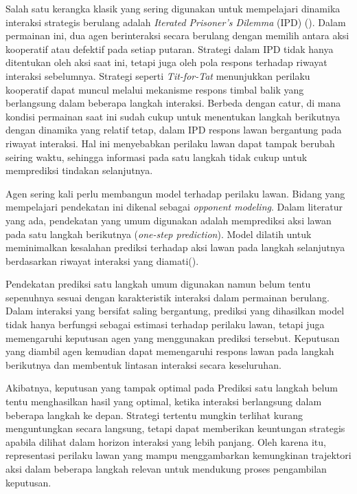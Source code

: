 Salah satu kerangka klasik yang sering digunakan untuk mempelajari dinamika interaksi strategis berulang adalah \textit{Iterated Prisoner's Dilemma} (IPD) (\cite{axelrod_evolution_1981}). Dalam permainan ini, dua agen berinteraksi secara berulang dengan memilih antara aksi kooperatif atau defektif pada setiap putaran. Strategi dalam IPD tidak hanya ditentukan oleh aksi saat ini, tetapi juga oleh pola respons terhadap riwayat interaksi sebelumnya. Strategi seperti \textit{Tit-for-Tat} menunjukkan perilaku kooperatif dapat muncul melalui mekanisme respons timbal balik yang berlangsung dalam beberapa langkah interaksi. Berbeda dengan catur, di mana kondisi permainan saat ini sudah cukup untuk menentukan langkah berikutnya dengan dinamika yang relatif tetap, dalam IPD respons lawan bergantung pada riwayat interaksi. Hal ini menyebabkan perilaku lawan dapat tampak berubah seiring waktu, sehingga informasi pada satu langkah tidak cukup untuk memprediksi tindakan selanjutnya.

Agen sering kali perlu membangun model terhadap perilaku lawan. Bidang yang mempelajari pendekatan ini dikenal sebagai \textit{opponent modeling}. Dalam literatur yang ada, pendekatan yang umum digunakan adalah memprediksi aksi lawan pada satu langkah berikutnya (\textit{one-step prediction}). Model dilatih untuk meminimalkan kesalahan prediksi terhadap aksi lawan pada langkah selanjutnya berdasarkan riwayat interaksi yang diamati(\cite{nashed_survey_2022}).

Pendekatan prediksi satu langkah umum digunakan namun belum tentu sepenuhnya sesuai dengan karakteristik interaksi dalam permainan berulang. Dalam interaksi yang bersifat saling bergantung, prediksi yang dihasilkan model tidak hanya berfungsi sebagai estimasi terhadap perilaku lawan, tetapi juga memengaruhi keputusan agen yang menggunakan prediksi tersebut. Keputusan yang diambil agen kemudian dapat memengaruhi respons lawan pada langkah berikutnya dan membentuk lintasan interaksi secara keseluruhan.

Akibatnya, keputusan yang tampak optimal pada Prediksi satu langkah belum tentu menghasilkan hasil yang optimal, ketika interaksi berlangsung dalam beberapa langkah ke depan. Strategi tertentu mungkin terlihat kurang menguntungkan secara langsung, tetapi dapat memberikan keuntungan strategis apabila dilihat dalam horizon interaksi yang lebih panjang. Oleh karena itu, representasi perilaku lawan yang mampu menggambarkan kemungkinan trajektori aksi dalam beberapa langkah relevan untuk mendukung proses pengambilan keputusan.

